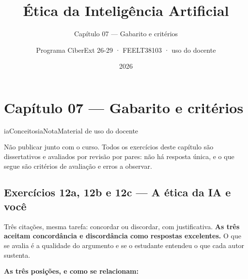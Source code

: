 \documentclass[
  11pt,
]{article}
\title{Ética da Inteligência Artificial}
\subtitle{Capítulo 07 --- Gabarito e critérios}
\author{Programa CiberExt 26-29 · FEELT38103 · uso do docente}
\date{2026}
\newenvironment{nota}[1][Nota]{\begin{iabox}{iaConceitos}{iaNota}{#1}}{\end{iabox}}
\begin{document}
\maketitle

{
\hypersetup{linkcolor=iaConceitos}
\setcounter{tocdepth}{2}
\tableofcontents
}
\hypertarget{capuxedtulo-07-gabarito-e-crituxe9rios}{%
\section{Capítulo 07 --- Gabarito e
critérios}\label{capuxedtulo-07-gabarito-e-crituxe9rios}}

\begin{nota}[Material de uso do docente]

Não publicar junto com o curso. Todos os exercícios deste capítulo são
dissertativos e avaliados por revisão por pares: não há resposta única,
e o que segue são critérios de avaliação e erros a observar.

\end{nota}

\hypertarget{exercuxedcios-12a-12b-e-12c-a-uxe9tica-da-ia-e-vocuxea}{%
\subsection{Exercícios 12a, 12b e 12c --- A ética da IA e
você}\label{exercuxedcios-12a-12b-e-12c-a-uxe9tica-da-ia-e-vocuxea}}

Três citações, mesma tarefa: concordar ou discordar, com justificativa.
\textbf{As três aceitam concordância e discordância como respostas
excelentes.} O que se avalia é a qualidade do argumento e se o estudante
entendeu o que cada autor sustenta.

\textbf{As três posições, e como se relacionam:}
\end{document}
